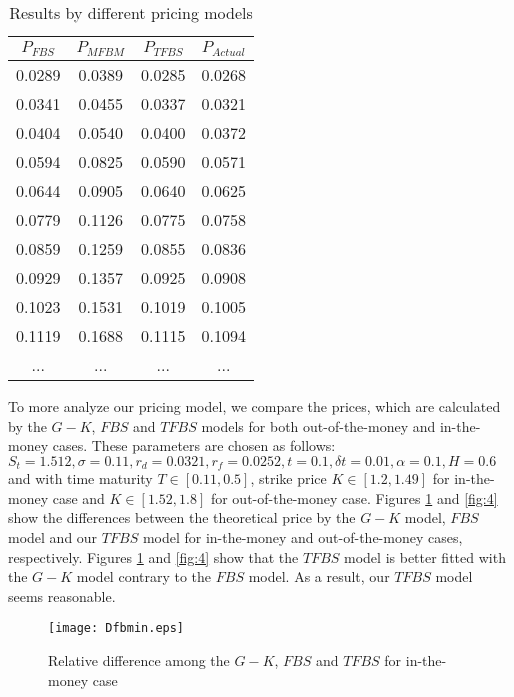 \documentclass[a4paper,11pt]{amsart}
\numberwithin{equation}{section}
\theoremstyle{definition}
\theoremstyle{plain}
\theoremstyle{definition}
\newcommand{\1}{\mathbf{1}}
\begin{document}
\begin{table}[H]
\centering
\caption{Results by different pricing models}
 \begin{tabular}{|c c c c|}
 \hline
$P_{FBS}$& $P_{MFBM}$& $P_{TFBS}$ & $P_{Actual}$\\ [0.5ex]
 \hline
0.0289& 0.0389& 0.0285 & 0.0268   \\
0.0341& 0.0455& 0.0337 & 0.0321  \\
0.0404& 0.0540& 0.0400  & 0.0372 \\
0.0594& 0.0825& 0.0590 & 0.0571    \\
0.0644& 0.0905& 0.0640 & 0.0625 \\
0.0779& 0.1126& 0.0775  &  0.0758   \\
0.0859& 0.1259& 0.0855  &  0.0836  \\
0.0929& 0.1357& 0.0925  & 0.0908  \\
0.1023& 0.1531& 0.1019  & 0.1005    \\
0.1119& 0.1688& 0.1115  & 0.1094 \\
...&...&... &...      \\ [1ex]
 \hline
\end{tabular}
\label{table:1}
\end{table}






To more analyze our pricing model, we compare the prices, which are calculated by the $G-K$, $FBS$ and $TFBS$ models for both out-of-the-money and in-the-money cases. These parameters are chosen as follows: $S_t=1.512, \sigma=0.11, r_d=0.0321, r_f=0.0252, t=0.1,  \delta t=0.01, \alpha=0.1, H=0.6$ and with time maturity $T\in [0.11,0.5]$, strike price $K\in[1.2,1.49]$ for in-the-money case and $K\in[1.52,1.8]$ for out-of-the-money case. Figures \ref{fig:3} and \ref{fig:4} show the differences between the theoretical price by the $G-K$ model, $FBS$ model and our $TFBS$ model for in-the-money and out-of-the-money cases, respectively. Figures \ref{fig:3} and \ref{fig:4} show that the $TFBS$ model is better fitted with the $G-K$ model contrary to the $FBS$ model. As a result, our $TFBS$ model seems reasonable.


\begin{figure}[H]
  \centering
          \texttt{[image: Dfbmin.eps]}

  \caption{Relative difference among the $G-K$, $FBS$ and $TFBS$ for in-the-money case}
\label{fig:3}
\end{figure}
\end{document}
